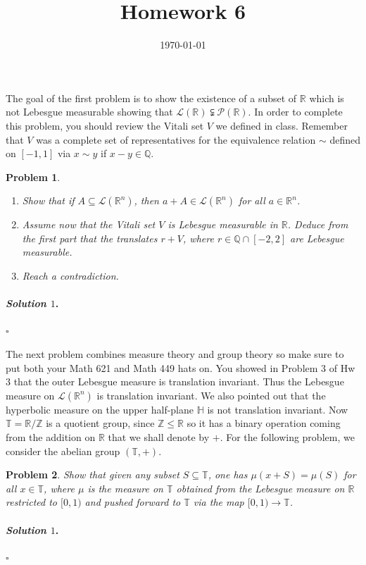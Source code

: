 \documentclass[reqno]{amsart}
\theoremstyle{plain}
\newtheorem{problem}{Problem}
\theoremstyle{definition}
\newenvironment{solution1}{\paragraph{\emph{Solution $1$}.}}{\hfill$\square$}
\begin{document}
 

\title[Homework 6]{Homework 6}

\date{\today} 
\maketitle 


The goal of the first problem is to show the existence of a subset of $\mathbb{R}$ which is not Lebesgue measurable showing that $\mathcal{L}(\mathbb{R}) \subsetneqq \mathcal{P}(\mathbb{R})$.  In order to complete this problem, you should review the Vitali set $V$ we defined in class.  Remember that $V$ was a complete set of representatives for the equivalence relation $\sim$ defined on $[-1,1]$ via $x \sim y$ if $x - y \in \mathbb{Q}$.
\begin{problem}
\hfill
\begin{enumerate}
\item Show that if $A \subseteq \mathcal{L}(\mathbb{R}^{n})$, then $a + A \in \mathcal{L}(\mathbb{R}^{n})$ for all $a \in \mathbb{R}^{n}$.
\item Assume now that the Vitali set $V$ is Lebesgue measurable in $\mathbb{R}$.  Deduce from the first part that the translates $r + V$, where $r \in \mathbb{Q}\cap [-2,2]$ are Lebesgue measurable.
\item Reach a contradiction.
\end{enumerate}
\end{problem}
\begin{solution1}

\end{solution1}

The next problem combines measure theory and group theory so make sure to put both your Math 621 and Math 449 hats on.  You showed in Problem 3 of Hw 3 that the outer Lebesgue measure is translation invariant.  Thus the Lebesgue measure on $\mathcal{L}(\mathbb{R}^{n})$ is translation invariant.  We also pointed out that the hyperbolic measure on the upper half-plane $\mathbb{H}$ is not translation invariant.  Now $\mathbb{T} = \mathbb{R}/\mathbb{Z}$ is a quotient group, since $\mathbb{Z} \le \mathbb{R}$ so it has a binary operation coming from the addition on $\mathbb{R}$ that we shall denote by $+$.  For the following problem, we consider the abelian group $(\mathbb{T},+)$.
\begin{problem}
Show that given any subset $S \subseteq \mathbb{T}$, one has $\mu(x + S) = \mu(S)$ for all $x \in \mathbb{T}$, where $\mu$ is the measure on $\mathbb{T}$ obtained from the Lebesgue measure on $\mathbb{R}$ restricted to $[0,1)$ and pushed forward to $\mathbb{T}$ via the map $[0,1) \rightarrow \mathbb{T}$.
\end{problem}
\begin{solution1}

\end{solution1}
\end{document}
